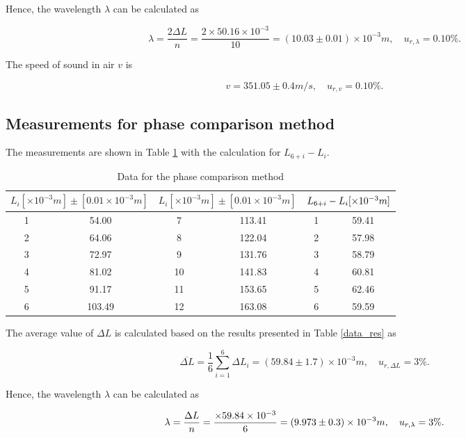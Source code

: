Hence, the wavelength $\lambda$ can be calculated as

\[
        \lambda=\frac{2\Delta L}{n}=\frac{2\times50.16\times 10^{-3} }{10}=(10.03\pm0.01)\times 10^{-3} m,\quad u_{r,\lambda}=0.10\%.
\]

The speed of sound in air $v$ is

\[
    v=351.05\pm0.4 m/s,\quad u_{r,v}=0.10\%.
\]

\subsection{Measurements for phase comparison method}

The measurements are shown in Table \ref{data_pha} with the calculation for $L_{6+i}-L_i$.

\begin{table}[H] \small
    \centering
    \begin{tabular}{|c|c|c|c|c|c|}
    \hline
        \multicolumn{2}{|c|}{$L_i[\times 10^{-3} m]\pm[0.01\times 10^{-3} m]$} & 
        \multicolumn{2}{|c|}{$L_i[\times 10^{-3} m]\pm[0.01\times 10^{-3} m]$} &
        \multicolumn{2}{|c|}{$L_{6+i}-L_i[\times 10^{-3}m]$}\\\hline
        1 & 54.00 & 7 & 113.41 & 1 & 59.41 \\\hline
        2 & 64.06 & 8 & 122.04 & 2 & 57.98 \\\hline
        3 & 72.97 & 9 & 131.76 & 3 & 58.79 \\\hline
        4 & 81.02 & 10 & 141.83 & 4 & 60.81 \\\hline
        5 & 91.17 & 11 & 153.65 & 5 & 62.46 \\\hline
        6 & 103.49 & 12 & 163.08 & 6 & 59.59 \\\hline
    \end{tabular}
    \caption{Data for the phase comparison method}\label{data_pha}
\end{table}
    
The average value of $\Delta L$ is calculated  based on the results presented in Table \ref{data_res} as

\[
    \overline{\Delta L}=\frac{1}{6}\sum_{i=1}^{6}\Delta L_i=(59.84\pm 1.7)\times 10^{-3} m,\quad u_{r,\Delta L}=3\%.
\]

Hence, the wavelength $\lambda$ can be calculated as

\[
    \lambda=\frac{\Delta L}{n}=\frac{\times59.84\times 10^{-3}}{6}=(9.973\pm0.3)\times 10^{-3} m,\quad u_{r,\lambda}=3\%.
\]

